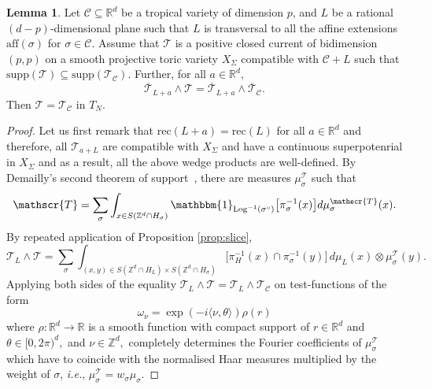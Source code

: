 \documentclass[11pt]{amsart}
\def\Log{{\rm Log}}
\theoremstyle{definition}
\newtheorem{lemma}[theorem]{Lemma}
\newcommand{\R}{\mathbb{R}}
\newcommand{\Z}{\mathbb{Z}}
\newcommand{\cC}{\mathcal{C}}
\newcommand{\sT}{\mathscr{T}}
\newcommand{\supp}[1]{{\mathrm{supp}(#1)}}
\begin{document}


\begin{lemma}\label{lem:radon}
    Let $\cC\subseteq \R^d$ be a tropical variety of dimension $p$, and $L$ be a rational $(d-p)$-dimensional plane such that $L$ is transversal to all the affine extensions $\text{aff}(\sigma)$ for $\sigma \in \cC.$
    Assume that  $\sT$ is a positive closed current of bidimension $(p,p)$ on a smooth projective toric variety $X_{\Sigma}$ compatible with $\cC + L$ such that $\supp{\sT} \subseteq \supp{\sT_{\cC}}.$ Further, for all $a \in \R^d,$
    $$
    \overline{\sT}_{L+a } \wedge \sT = \overline{\sT}_{L+a} \wedge \overline{\sT}_{\cC}.
    $$
  Then $\sT = {\sT_{\cC}}$ in $T_N.$
\end{lemma}

\begin{proof}
Let us first remark that $\text{rec}(L+a) = \text{rec}(L)$ for all $a \in \R^d$ and therefore, all $\sT_{a+ L}$ are compatible with $X_{\Sigma}$ and have a continuous superpotenrial in $X_{\Sigma}$ and as a result, all the above wedge products are well-defined. By Demailly's second theorem of support~\cite[III.2.13]{DemaillyBook1}, there are measures $\mu^{\sT}_{\sigma}$ such that 
$$
\sT = \sum_{\sigma}\int_ {x \in S(\Z^d \cap H_{\sigma})} \mathbbm{1}_{\Log^{-1}(\sigma^{\circ})}\big[\pi_{\sigma}^{-1}(x)\big] d\mu^{\sT}_{\sigma}(x).
$$
By repeated application of  Proposition \ref{prop:slice}, 
$$
\sT_{L} \wedge \sT =  \sum_{\sigma}\int_{(x,y) \in S(\Z^d \cap H_{L})\times  S(\Z^d \cap H_{\sigma}) } \big[\pi_{H}^{-1}(x)\cap \pi_{\sigma}^{-1}(y) \big]\,d \mu_{L}(x) \otimes \mu^{\sT}_{\sigma}(y).
$$
Applying both sides of the equality $\sT_{L} \wedge \sT = \sT_{L} \wedge \sT_{\cC}$ on test-functions of the form
\begin{equation*}\label{eq:fourier-forms}
\omega_{\nu}= \exp(-i\langle \nu , \theta \rangle )\rho(r) 
\end{equation*}
where $\rho: \R^d \to \R$ is a smooth function with compact support of $r \in \R^d$ and $\theta \in [0,2\pi)^d,$ and $\nu \in \Z^d,$ completely determines the Fourier coefficients of $\mu^{\sT}_{\sigma}$ which have to coincide with the normalised Haar measures multiplied by the weight of $\sigma$, \textit{i.e.}, $\mu_{\sigma}^{\sT}= w_{\sigma} \mu_{\sigma}.$
\end{proof}
\end{document}
